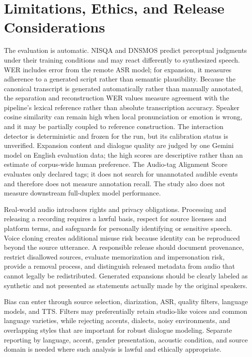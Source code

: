 \documentclass[10pt,twocolumn]{article}
\begin{document}
\section{Limitations, Ethics, and Release Considerations}

The evaluation is automatic. NISQA and DNSMOS predict perceptual judgments under their training conditions and may react differently to synthesized speech. WER includes error from the remote ASR model; for expansion, it measures adherence to a generated script rather than semantic plausibility. Because the canonical transcript is generated automatically rather than manually annotated, the separation and reconstruction WER values measure agreement with the pipeline's lexical reference rather than absolute transcription accuracy. Speaker cosine similarity can remain high when local pronunciation or emotion is wrong, and it may be partially coupled to reference construction. The interaction detector is deterministic and frozen for the run, but its calibration status is unverified. Expansion content and dialogue quality are judged by one Gemini model on English evaluation data; the high scores are descriptive rather than an estimate of corpus-wide human preference. The Audio-tag Alignment Score evaluates only declared tags; it does not search for unannotated audible events and therefore does not measure annotation recall. The study also does not measure downstream full-duplex model performance.

Real-world audio introduces rights and privacy obligations. Processing and releasing a recording requires a lawful basis, respect for source licenses and platform terms, and safeguards for personally identifying or sensitive speech. Voice cloning creates additional misuse risk because identity can be reproduced beyond the source utterance. A responsible release should document provenance, restrict disallowed sources, evaluate memorization and impersonation risk, provide a removal process, and distinguish released metadata from audio that cannot legally be redistributed. Generated expansions should be clearly labeled as synthetic and not presented as statements actually made by the original speakers.

Bias can enter through source selection, diarization, ASR, quality filters, language models, and TTS. Filters may preferentially retain studio-like voices and common language varieties, while rejecting accents, dialects, noisy environments, and overlapping styles that are important for robust dialogue modeling. Separate reporting by language, accent, gender presentation, acoustic condition, and source domain is needed where such analysis is lawful and ethically appropriate.
\end{document}
